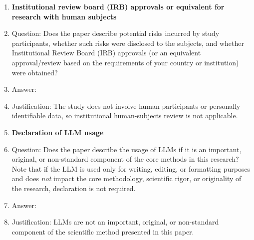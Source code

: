 \begin{enumerate}
\item {\bf Institutional review board (IRB) approvals or equivalent for research with human subjects}
    \item[] Question: Does the paper describe potential risks incurred by study participants, whether such risks were disclosed to the subjects, and whether Institutional Review Board (IRB) approvals (or an equivalent approval/review based on the requirements of your country or institution) were obtained?
    \item[] Answer: \answerNA{}
    \item[] Justification: The study does not involve human participants or
    personally identifiable data, so institutional human-subjects review is not applicable.

\item {\bf Declaration of LLM usage}
    \item[] Question: Does the paper describe the usage of LLMs if it is an important, original, or non-standard component of the core methods in this research? Note that if the LLM is used only for writing, editing, or formatting purposes and does \emph{not} impact the core methodology, scientific rigor, or originality of the research, declaration is not required.
    \item[] Answer: \answerNA{}
    \item[] Justification: LLMs are not an important, original, or non-standard
    component of the scientific method presented in this paper.

\end{enumerate}

